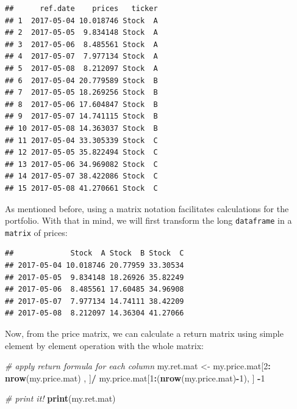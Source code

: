 \documentclass[11pt,]{book}
\newenvironment{Shaded}{\begin{snugshade}}{\end{snugshade}}
\newcommand{\KeywordTok}[1]{\textcolor[rgb]{0.27,0.27,0.27}{\textbf{#1}}}
\newcommand{\DataTypeTok}[1]{\textcolor[rgb]{0.27,0.27,0.27}{#1}}
\newcommand{\DecValTok}[1]{\textcolor[rgb]{0.06,0.06,0.06}{#1}}
\newcommand{\StringTok}[1]{\textcolor[rgb]{0.5,0.5,0.5}{#1}}
\newcommand{\CommentTok}[1]{\textcolor[rgb]{0.56,0.35,0.01}{\textit{#1}}}
\newcommand{\OperatorTok}[1]{\textcolor[rgb]{0.81,0.36,0.00}{\textbf{#1}}}
\newcommand{\NormalTok}[1]{#1}
\begin{document}
\begin{verbatim}
##      ref.date    prices   ticker
## 1  2017-05-04 10.018746 Stock  A
## 2  2017-05-05  9.834148 Stock  A
## 3  2017-05-06  8.485561 Stock  A
## 4  2017-05-07  7.977134 Stock  A
## 5  2017-05-08  8.212097 Stock  A
## 6  2017-05-04 20.779589 Stock  B
## 7  2017-05-05 18.269256 Stock  B
## 8  2017-05-06 17.604847 Stock  B
## 9  2017-05-07 14.741115 Stock  B
## 10 2017-05-08 14.363037 Stock  B
## 11 2017-05-04 33.305339 Stock  C
## 12 2017-05-05 35.822494 Stock  C
## 13 2017-05-06 34.969082 Stock  C
## 14 2017-05-07 38.422086 Stock  C
## 15 2017-05-08 41.270661 Stock  C
\end{verbatim}

As mentioned before, using a matrix notation facilitates calculations
for the portfolio. With that in mind, we will first transform the long
\texttt{dataframe} in a \texttt{matrix} of prices:

\begin{Shaded}
\end{Shaded}

\begin{verbatim}
##             Stock  A Stock  B Stock  C
## 2017-05-04 10.018746 20.77959 33.30534
## 2017-05-05  9.834148 18.26926 35.82249
## 2017-05-06  8.485561 17.60485 34.96908
## 2017-05-07  7.977134 14.74111 38.42209
## 2017-05-08  8.212097 14.36304 41.27066
\end{verbatim}

Now, from the price matrix, we can calculate a return matrix using
simple element by element operation with the whole matrix:

\begin{Shaded}
\begin{Highlighting}[]
\CommentTok{# apply return formula for each column}
\NormalTok{my.ret.mat <-}\StringTok{ }\NormalTok{my.price.mat[}\DecValTok{2}\OperatorTok{:}\StringTok{ }\KeywordTok{nrow}\NormalTok{(my.price.mat)   , ]}\OperatorTok{/}
\StringTok{              }\NormalTok{my.price.mat[}\DecValTok{1}\OperatorTok{:}\NormalTok{(}\KeywordTok{nrow}\NormalTok{(my.price.mat)}\OperatorTok{-}\DecValTok{1}\NormalTok{), ] }\OperatorTok{-}\DecValTok{1} 

\CommentTok{# print it!}
\KeywordTok{print}\NormalTok{(my.ret.mat)}
\end{Highlighting}
\end{Shaded}
\end{document}
